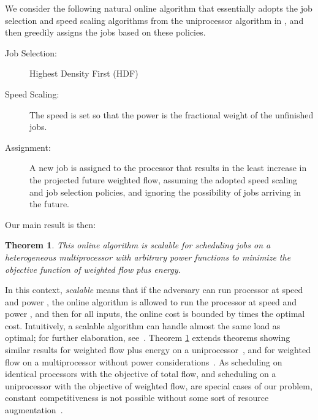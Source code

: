 \documentclass[11pt]{article}
\newtheorem{theorem}[lemma]{Theorem}
\begin{document}
We consider the following natural online algorithm that essentially adopts the
job selection and speed scaling algorithms from the uniprocessor
algorithm in \cite{BCP}, and then greedily assigns the jobs based on
these policies.
\begin{shadebox}
\begin{description}
\item[Job Selection:] Highest Density First (HDF)
\item[Speed Scaling:] The speed is set so that the power is the fractional
  weight of the unfinished jobs.
\item[Assignment:] A new job is assigned to the processor
  that results in the least increase in the projected future weighted
  flow, assuming the adopted speed scaling and job selection policies, and
  ignoring the possibility of jobs arriving in the future.
\end{description}
\end{shadebox}
Our main result is then:
\begin{theorem}
  \label{thm:main1}
  This online algorithm is scalable for scheduling jobs on a
  heterogeneous multiprocessor with arbitrary power functions to
  minimize the objective function of weighted flow plus energy.
\end{theorem}
In this context, \emph{scalable} means that if the adversary can run
processor  at speed  and power , the online algorithm is
allowed to run the processor at speed  and power ,
and then for all inputs, the online cost is bounded by 
times the optimal cost.  Intuitively,
a scalable algorithm can handle almost the same load as
optimal;  for further elaboration, see~\cite{PST,Pruhs07}.  Theorem
\ref{thm:main1} extends theorems showing similar results for weighted
flow plus energy on a uniprocessor~\cite{BCP,Lachlan2009}, and for
weighted flow on a multiprocessor without power
considerations~\cite{Chadha2009}.  As scheduling on identical processors
with the objective of total flow, and scheduling on a uniprocessor with
the objective of weighted flow, are special cases of our problem, constant
competitiveness is not possible without some sort of resource
augmentation~\cite{LR,BC09}.
\end{document}
